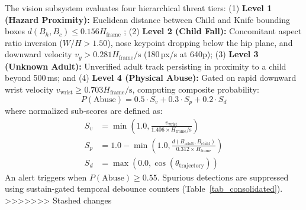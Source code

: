 \documentclass[conference]{IEEEtran}
\begin{document}
The vision subsystem evaluates four hierarchical threat tiers: (1) \textbf{Level 1 (Hazard Proximity):} Euclidean distance between Child and Knife bounding boxes $d(B_h, B_c) \le 0.156 H_{\text{frame}}$ \cite{b15}; (2) \textbf{Level 2 (Child Fall):} Concomitant aspect ratio inversion ($W/H > 1.50$), nose keypoint dropping below the hip plane, and downward velocity $v_y > 0.281 H_{\text{frame}}/\text{s}$ (180\,px/s at 640p); (3) \textbf{Level 3 (Unknown Adult):} Unverified adult track persisting in proximity to a child beyond 500\,ms; and (4) \textbf{Level 4 (Physical Abuse):} Gated on rapid downward wrist velocity $v_{\text{wrist}} \ge 0.703 H_{\text{frame}}/\text{s}$, computing composite probability:
\begin{equation}
P(\text{Abuse}) = 0.5 \cdot S_v + 0.3 \cdot S_p + 0.2 \cdot S_d \label{eq6}
\end{equation}
where normalized sub-scores are defined as:
\begin{align}
S_v &= \min\left(1.0, \frac{v_{\text{wrist}}}{1.406 \times H_{\text{frame}}/\text{s}}\right) \\
S_p &= 1.0 - \min\left(1.0, \frac{d(B_{\text{adult}}, B_{\text{child}})}{0.312 \times H_{\text{frame}}}\right) \\
S_d &= \max(0.0, \cos(\theta_{\text{trajectory}}))
\end{align}
An alert triggers when $P(\text{Abuse}) \ge 0.55$. Spurious detections are suppressed using sustain-gated temporal debounce counters (Table~\ref{tab_consolidated}).
>>>>>>> Stashed changes
\end{document}
